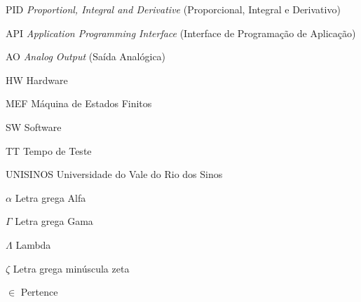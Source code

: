 \listoffigures*
\cleardoublepage
\listoftables*
\cleardoublepage
\begin{siglas}
\item[PID] \textit{Proportionl, Integral and Derivative} (Proporcional, Integral e Derivativo)
\item[API] \textit{Application Programming Interface} (Interface de Programação de Aplicação)
\item[AO] \textit{Analog Output} (Saída Analógica)
\item[HW] Hardware
\item[MEF] Máquina de Estados Finitos
\item[SW] Software
\item[TT] Tempo de Teste
\item[UNISINOS] Universidade do Vale do Rio dos Sinos
\end{siglas}
\begin{simbolos}
  \item[$ \alpha $] Letra grega Alfa
   \item[$ \Gamma $] Letra grega Gama
   \item[$ \Lambda $] Lambda
   \item[$ \zeta $] Letra grega minúscula zeta
   \item[$ \in $] Pertence
\end{simbolos}